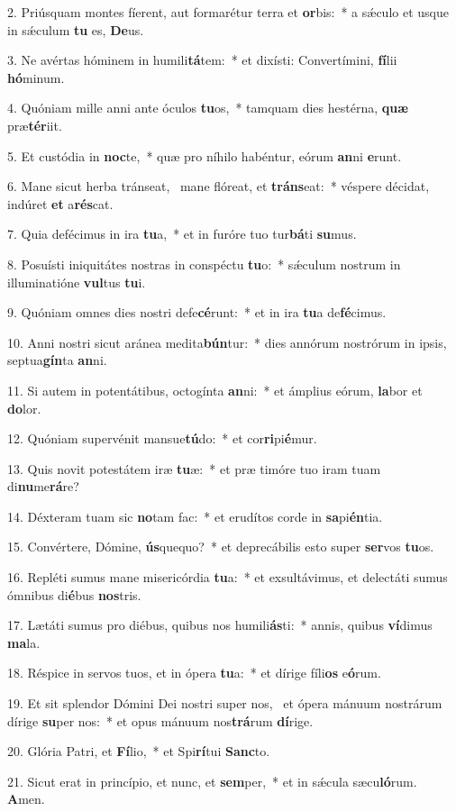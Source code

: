 2. Priúsquam montes fíerent, aut formarétur terra et \textbf{or}bis:~*  a sǽculo et usque in sǽculum \textbf{tu} es, \textbf{De}us.\

3. Ne avértas hóminem in humili\textbf{tá}tem:~*  et dixísti: Convertímini, \textbf{fí}lii \textbf{hó}minum.\

4. Quóniam mille anni ante óculos \textbf{tu}os,~*  tamquam dies hestérna, \textbf{quæ} præ\textbf{tér}iit.\

5. Et custódia in \textbf{noc}te,~*  quæ pro níhilo habéntur, eórum \textbf{an}ni \textbf{e}runt.\

6. Mane sicut herba tránseat, \dag\  mane flóreat, et \textbf{tráns}eat:~*  véspere décidat, indúret \textbf{et} a\textbf{rés}cat.\

7. Quia defécimus in ira \textbf{tu}a,~*  et in furóre tuo tur\textbf{bá}ti \textbf{su}mus.\

8. Posuísti iniquitátes nostras in conspéctu \textbf{tu}o:~*  sǽculum nostrum in illuminatióne \textbf{vul}tus \textbf{tu}i.\

9. Quóniam omnes dies nostri defe\textbf{cé}runt:~*  et in ira \textbf{tu}a de\textbf{fé}cimus.\

10. Anni nostri sicut aránea medita\textbf{bún}tur:~*  dies annórum nostrórum in ipsis, septua\textbf{gín}ta \textbf{an}ni.\

11. Si autem in potentátibus, octogínta \textbf{an}ni:~*  et ámplius eórum, \textbf{la}bor et \textbf{do}lor.\

12. Quóniam supervénit mansue\textbf{tú}do:~*  et cor\textbf{ri}pi\textbf{é}mur.\

13. Quis novit potestátem iræ \textbf{tu}æ:~*  et præ timóre tuo iram tuam di\textbf{nu}me\textbf{rá}re?\

14. Déxteram tuam sic \textbf{no}tam fac:~*  et erudítos corde in \textbf{sa}pi\textbf{én}tia.\

15. Convértere, Dómine, \textbf{ús}quequo?~*  et deprecábilis esto super \textbf{ser}vos \textbf{tu}os.\

16. Repléti sumus mane misericórdia \textbf{tu}a:~*  et exsultávimus, et delectáti sumus ómnibus di\textbf{é}bus \textbf{nos}tris.\

17. Lætáti sumus pro diébus, quibus nos humili\textbf{ás}ti:~*  annis, quibus \textbf{ví}dimus \textbf{ma}la.\

18. Réspice in servos tuos, et in ópera \textbf{tu}a:~*  et dírige fíli\textbf{os} e\textbf{ó}rum.\

19. Et sit splendor Dómini Dei nostri super nos, \dag\  et ópera mánuum nostrárum dírige \textbf{su}per nos:~*  et opus mánuum nos\textbf{trá}rum \textbf{dí}rige.\

20. Glória Patri, et \textbf{Fí}lio,~*  et Spi\textbf{rí}tui \textbf{Sanc}to.\

21. Sicut erat in princípio, et nunc, et \textbf{sem}per,~*  et in sǽcula sæcu\textbf{ló}rum. \textbf{A}men.\

